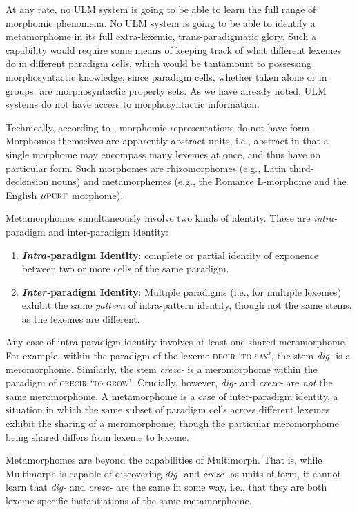 At any rate, no ULM system is going to be able to learn the full range of morphomic
phenomena. No ULM system is going to be able to identify a metamorphome in its full
 extra-lexemic, trans-paradigmatic glory. Such a capability would require some means
of keeping track of what different lexemes do in different paradigm cells, which would be tantamount
to possessing morphosyntactic knowledge, since paradigm cells, whether taken alone or in groups,
are morphosyntactic property sets. As we have already noted, ULM systems do not
have access to morphosyntactic information.

	Technically, according to \cite{round:2011}, morphomic 
	representations do not have form. Morphomes
	themselves are apparently abstract units, i.e., abstract in that 
	a single morphome may encompass many lexemes at once, and thus
	have no particular form. Such morphomes are rhizomorphomes (e.g.,
	Latin third-declension nouns) and metamorphemes (e.g., the Romance L-morphome and the English
	${\mu}\textsc{perf}$ morphome).

	Metamorphomes simultaneously involve two kinds of identity. These are \emph{intra-}paradigm and {inter-}paradigm identity: 
	\begin{enumerate}
		\item \textbf{\emph{Intra-}paradigm Identity}: complete or partial identity of exponence between two or more cells of the same paradigm. 
		\item \textbf{\emph{Inter-}paradigm Identity}: Multiple paradigms (i.e., for multiple lexemes) exhibit the same \emph{pattern} of intra-pattern identity, though not the same stems, as the lexemes are different.
	\end{enumerate} 
Any case of intra-paradigm identity involves at least one shared 
meromorphome. For example, within the paradigm of the lexeme 
\textsc{decir} \textsc{`to say'}, 
the stem \textit{dig-} is a meromorphome. Similarly, the stem \textit{crezc-} 
is a meromorphome within the paradigm of 
\textsc{crecir} \textsc{`to grow'}. Crucially, however, 
\textit{dig-} and \textit{crezc-} are \emph{not} the same meromorphome. 
A metamorphome is a case of inter-paradigm identity, a situation 
in which the same subset of paradigm cells across different lexemes 
exhibit the sharing of a meromorphome, 
though the particular meromorphome being shared differs from lexeme to 
lexeme. 

Metamorphomes are beyond the capabilities of Multimorph. 
That is, while Multimorph is capable of discovering \textit{dig-} and \textit{crezc-} as units of form, 
it cannot learn that \textit{dig-} and \textit{crezc-} are the same 
in some way, i.e., that they are both lexeme-specific instantiations of the
same metamorphome.

